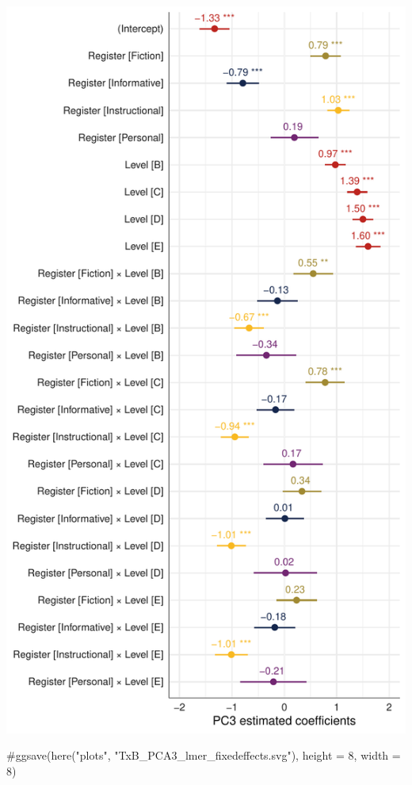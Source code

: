 \documentclass[
  letterpaper,
  DIV=11,
  numbers=noendperiod]{scrreprt}
\newenvironment{Shaded}{\begin{snugshade}}{\end{snugshade}}
\newcommand{\CommentTok}[1]{\textcolor[rgb]{0.37,0.37,0.37}{#1}}
\begin{document}
\includegraphics{E_Ch6_Analysis_files/figure-pdf/Dim3model-1.pdf}

\begin{Shaded}
\begin{Highlighting}[]
\CommentTok{\#ggsave(here("plots", "TxB\_PCA3\_lmer\_fixedeffects.svg"), height = 8, width = 8)}
\end{Highlighting}
\end{Shaded}
\end{document}
